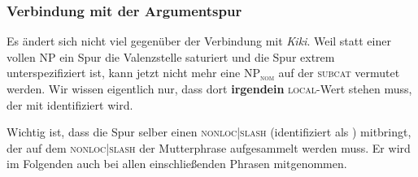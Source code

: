 \documentclass[10pt,a3paper]{article}
\newcommand{\rot}[1]{\textcolor{rot}{#1}}
\newcommand{\orongsch}[1]{\textcolor{orongsch}{#1}}
\newcommand{\tuerkis}[1]{\textcolor{tuerkis}{#1}}
\newcommand{\braun}[1]{\textcolor{braun}{#1}}
\newcommand*{\mybox}[1]{\framebox{#1}}
\newcommand{\Sub}[1]{\ensuremath{_{\text{#1}}}}
\newcommand{\Zeile}{\vspace{\baselineskip}}
\begin{document}

\subsubsection{Verbindung mit der Argumentspur}

Es ändert sich nicht viel gegenüber der Verbindung mit \textit{Kiki}.
Weil statt einer vollen NP ein Spur die Valenzstelle saturiert und die Spur extrem unterspezifiziert ist, kann jetzt nicht mehr eine \textsc{NP\Sub{nom}} auf der \textsc{subcat} vermutet werden.
Wir wissen eigentlich nur, dass dort \textbf{irgendein} \textsc{local}-Wert stehen muss, der mit \mybox{200} identifiziert wird.

\Zeile

Wichtig ist, dass die Spur selber einen \textsc{nonloc|slash} (identifiziert als \mybox{200}) mitbringt, der auf dem \textsc{nonloc|slash} der Mutterphrase aufgesammelt werden muss.
Er wird im Folgenden auch bei allen einschließenden Phrasen mitgenommen.

\Zeile
\end{document}
